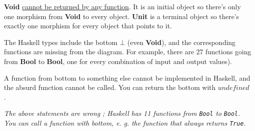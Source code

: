 \documentclass[]{article}
\newcommand{\parx}{\par\noindent}
\begin{document}
\noindent\textbf{Void} \href{https://stackoverflow.com/questions/38553622/inverse-of-the-absurd-function}{cannot be returned by any function}. It is an initial object so there's only one morphism from \textbf{Void} to every object.
\noindent\textbf{Unit} is a terminal object so there's exactly one morphism for every object that points to it.\\ 

\parx The Haskell types include the bottom $\bot$ (even \textbf{Void}), and the corresponding functions are missing from the diagram. For example, there are 27 functions going from \textbf{Bool} to \textbf{Bool}, one for every combination of input and output values).\\

\parx A function from bottom to something else cannot be implemented in Haskell, and the absurd function cannot be called. You can return the bottom with $undefined$.\\

\parx \textit{The above statements are wrong ; Haskell has 11 functions from \texttt{Bool} to \texttt{Bool}. You can call a function with bottom, e. g. the function that always returns \texttt{True}.}
\end{document}
